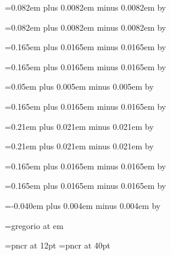 \newskip\interelementspace
\interelementspace=0.082em plus 0.0082em minus 0.0082em
\multiply\interelementspace by \factor

\newskip\largerspace
\largerspace=0.082em plus 0.0082em minus 0.0082em
\multiply\largerspace by \factor

\newskip\glyphspace
\glyphspace=0.165em plus 0.0165em minus 0.0165em
\multiply\glyphspace by \factor

\newskip\spacebeforecusto
\spacebeforecusto=0.165em plus 0.0165em minus 0.0165em
\multiply\spacebeforecusto by \factor

\newskip\spacebeforesigns
\spacebeforesigns=0.05em plus 0.005em minus 0.005em
\multiply\spacebeforesigns by \factor

\newskip\spaceafterlineclef
\spaceafterlineclef=0.165em plus 0.0165em minus 0.0165em
\multiply\spaceafterlineclef by \factor

\newskip\interwordspacenotes
\interwordspacenotes=0.21em plus 0.021em minus 0.021em
\multiply\interwordspacenotes by \factor

\newskip\interwordspacetext
\interwordspacetext=0.21em plus 0.021em minus 0.021em
\multiply\interwordspacetext by \factor

\newskip\bispace
\bispace=0.165em plus 0.0165em minus 0.0165em
\multiply\bispace by \factor

\newskip\trispace
\trispace=0.165em plus 0.0165em minus 0.0165em
\multiply\trispace by \factor

\newskip\punctuminclinatumshift
\punctuminclinatumshift=-0.040em plus 0.004em minus 0.004em
\multiply\punctuminclinatumshift by \factor



\newskip\barspace

\newskip\clefchangespace


\font\gregorianfont=gregorio at \the\factor em

\font\textfont=pncr at 12pt
\font\fontofinitial=pncr at 40pt
